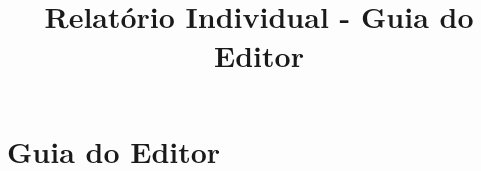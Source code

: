 \documentclass[10pt,glossaries,nolistformulas,nolisttables,nolistlistings,nolistalgorithms,draft,twoside,article]{gt-report}
\title{Relatório Individual - Guia do Editor}
\begin{document}
\chapter{Guia do Editor}
    
\end{document}
